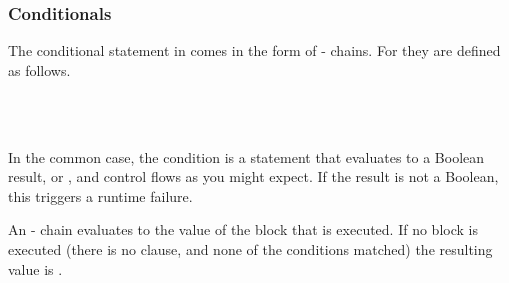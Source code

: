 \subsubsection{Conditionals}

The conditional statement in \Trilogy{} comes in the form of -
chains. For \Prose{} they are defined as follows.

\begin{bnf*}
     \\
     \\
\end{bnf*}

In the common case, the condition is a statement that evaluates to a Boolean
result,  or , and control flows as you might expect.
If the result is not a Boolean, this triggers a runtime failure.

An - chain evaluates to the value of the block that is executed.
If no block is executed (there is no  clause, and none of the
conditions matched) the resulting value is .

\begin{prooftree}
\end{prooftree}
\begin{prooftree}
\end{prooftree}
\begin{prooftree}
\end{prooftree}
\begin{prooftree}
\end{prooftree}

